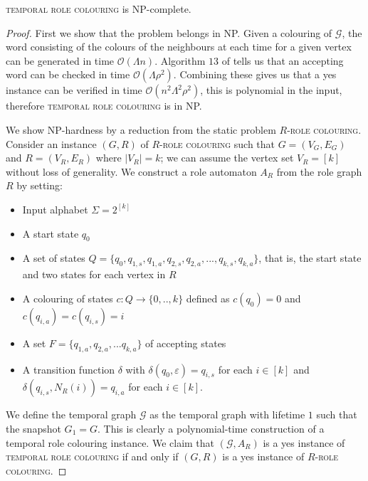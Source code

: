 \documentclass[runningheads]{llncs}
\begin{document}
\begin{theoremrep}
\textsc{temporal role colouring} is NP-complete.   
\end{theoremrep}
\begin{proof}
First we show that the problem belongs in NP. Given a colouring of $\mathcal{G}$, the word consisting of the colours of the neighbours at each time for a given vertex can be generated in time $\mathcal{O}(\Lambda n)$. 
Algorithm $13$ of \cite{esparza2023automata} tells us that an accepting word can be checked in time $\mathcal{O}(\Lambda \rho^2)$. Combining these gives us that a yes instance can be verified in time $\mathcal{O}(n^2\Lambda^2\rho^2)$, this is polynomial in the input, therefore \textsc{temporal role colouring} is in NP.

We show NP-hardness by a reduction from the static problem \textsc{$R$-role colouring}. Consider an instance $(G,R)$ of \textsc{$R$-role colouring} such that $G=(V_G,E_G)$ and $R=(V_R,E_R)$ where $|V_R|=k$; we can assume the vertex set $V_R=[k]$ without loss of generality. We construct a role automaton $A_R$ from the role graph $R$ by setting:
\begin{itemize}
    \item Input alphabet $\Sigma = 2^{[k]}$
    \item A start state $q_0$
    \item A set of states $Q=\{q_0,q_{1,s},q_{1,a},q_{2,s},q_{2,a},...,q_{k,s},q_{k,a}\}$,
 that is, the start state and two states for each vertex in $R$
    \item A colouring of states $c:Q \rightarrow \{0,..,k\}$ defined as $c(q_0)=0$ and $c(q_{i,a})=c(q_{i,s})=i$
    \item A set $F=\{q_{1,a},q_{2,a},...q_{k,a}\}$ of accepting states
    \item A transition function $\delta$ with $\delta(q_0,\varepsilon)=q_{i,s}$ for each $i \in [k]$ and $\delta(q_{i,s},N_R(i))=q_{i,a}$ for each $i \in [k]$.
\end{itemize}
We define the temporal graph $\mathcal{G}$ as the temporal graph with lifetime $1$ such that the snapshot $G_1=G$.
This is clearly a polynomial-time construction of a temporal role colouring instance.
We claim that $(\mathcal{G},A_R)$ is a yes instance of \textsc{temporal role colouring} if and only if $(G,R)$ is a yes instance of \textsc{$R$-role colouring}.


\end{proof}
\end{document}

